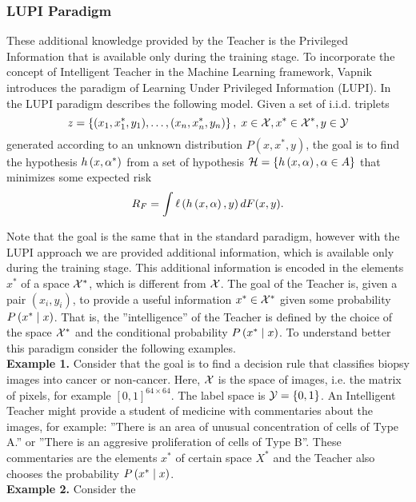 \subsubsection*{LUPI Paradigm}
These additional knowledge provided by the Teacher is the Privileged Information that is available only during the training stage.
To incorporate the concept of Intelligent Teacher in the Machine Learning framework, Vapnik introduces the paradigm of Learning Under Privileged Information (LUPI).
In the LUPI paradigm describes the following model. Given a set of i.i.d. triplets
$$ z = \left\{(x_1, x^*_1, y_1), \ldots, (x_n,x^*_n, y_n)\right\}, \; x \in \mathcal{X}, x^* \in \mathcal{X}^*, y \in \mathcal{Y} $$
generated according to an unknown distribution $P(x, x^*, y)$, the goal is to find the hypothesis $h\left(x, \alpha^*\right)$ from a set of hypothesis $\mathcal{H} = \left\{h\left(x, \alpha\right), \alpha \in A\right\}$ that minimizes some expected risk 
$$ R_F = \int \ell\left( h\left(x, \alpha\right), y\right) dF(x, y). $$

Note that the goal is the same that in the standard paradigm, however with the LUPI approach we are provided additional information, which is available only during the training stage. This additional information is encoded in the elements $x^*$ of a space $\mathcal{X}^*$, which is different from $\mathcal{X}$. The goal of the Teacher is, given a pair $(x_i, y_i)$, to provide a useful information $x^* \in \mathcal{X}^*$ given some probability $P\left( x^* \;\middle\vert\; x \right)$. That is, the ''intelligence'' of the Teacher is defined by the choice of the space $\mathcal{X}^*$ and the conditional probability $P\left( x^* \;\middle\vert\; x \right)$. 
To understand better this paradigm consider the following examples.
\\
\textbf{Example 1.} Consider that the goal is to find a decision rule that classifies biopsy images into cancer or non-cancer. Here, $\mathcal{X}$ is the space of images, i.e. the matrix of pixels, for example $[0, 1]^{64 \times 64}$. The label space is $\mathcal{Y} = \left\{0, 1\right\}$. An Intelligent Teacher might provide a student of medicine with commentaries about the images, for example: ''There is an area of unusual concentration of cells of Type A.'' or ''There is an aggresive proliferation of cells of Type B''. These commentaries are the elements $x^*$ of certain space $X^*$ and the Teacher also chooses the probability $P\left( x^* \;\middle\vert\; x \right)$.
\\
\textbf{Example 2.} Consider the  

